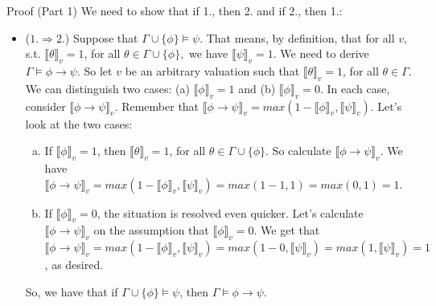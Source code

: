 \begin{frame}{Proof (Part 1)}
We need to show that if 1., then 2. and if 2., then 1.:
			
			\begin{itemize}
			
				\item ($1.\Rightarrow 2.$) Suppose that $\Gamma\cup\{\phi\}\vDash\psi$. That means, by definition, that for all $v$, s.t. $\llbracket\theta\rrbracket_v=1$, for all $\theta\in \Gamma\cup\{\phi\},$ we have $\llbracket\psi\rrbracket_v=1$. We need to derive $\Gamma\vDash \phi\to\psi$. So let $v$ be an arbitrary valuation such that $\llbracket\theta\rrbracket_v=1$, for all $\theta\in \Gamma$. We can distinguish two cases: (a) $\llbracket \phi\rrbracket_v=1$ and (b) $\llbracket \phi\rrbracket_v=0$. In each case, consider  $\llbracket\phi\to\psi\rrbracket_v$. Remember that $\llbracket\phi\to\psi\rrbracket_v=max(1-\llbracket\phi\rrbracket_v,\llbracket\psi\rrbracket_v)$. Let's look at the two cases:
				\begin{enumerate}[(a)]
				
					\item If $\llbracket \phi\rrbracket_v=1$, then $\llbracket\theta\rrbracket_v=1$, for all $\theta\in \Gamma\cup\{\phi\}$. So calculate $\llbracket\phi\to\psi\rrbracket_v$. We have $\llbracket\phi\to\psi\rrbracket_v=max(1-\llbracket\phi\rrbracket_v,\llbracket\psi\rrbracket_v)=max(1-1,1)=max(0,1)=1$.
					
					\item If $\llbracket \phi\rrbracket_v=0$, the situation is resolved even quicker. Let's calculate $\llbracket\phi\to\psi\rrbracket_v$ on the assumption that $\llbracket \phi\rrbracket_v=0$. We get that $\llbracket\phi\to\psi\rrbracket_v=max(1-\llbracket\phi\rrbracket_v,\llbracket\psi\rrbracket_v)=max(1-0, \llbracket\psi\rrbracket_v)=max(1, \llbracket\psi\rrbracket_v)=1$, as desired.
					
				\end{enumerate}
			So, we have that if $\Gamma\cup\{\phi\}\vDash\psi$, then $\Gamma\vDash\phi\to\psi$.


\end{itemize}

\end{frame}

